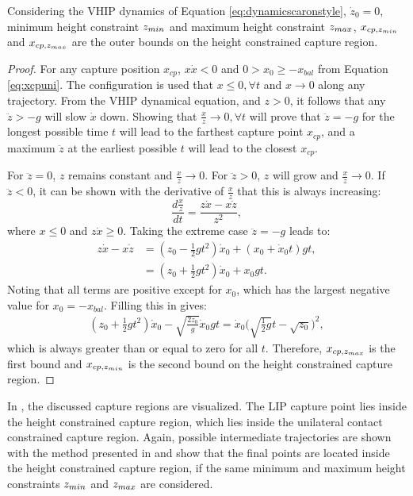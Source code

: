 \begin{lem}\label{lem:regionz}
Considering the \ac{VHIP} dynamics of Equation \eqref{eq:dynamicscaronstyle}, $\dot{z}_0=0$, minimum height constraint $z_{min}$ and maximum height constraint $z_{max}$, $x_{cp,z_{min}}$ and $x_{cp,z_{max}}$ are the outer bounds on the height constrained capture region.
\end{lem}
\begin{proof}
For any capture position $x_{cp}$, $x\dot{x}<0$ \cite{koolen2016balance} and $0>x_0\geq-x_{bal}$ from Equation \eqref{eq:xcpuni}. 
The configuration is used that $x \leq 0, \forall t$ and $x\rightarrow 0$ along any trajectory. From the \ac{VHIP} dynamical equation, and $z>0$, it follows that any $\ddot{z}>-g$ will slow $\dot{x}$ down. Showing that $\frac{x}{z}\rightarrow 0, \forall t$ will prove that $\ddot{z}=-g$ for the longest possible time $t$ will lead to the farthest capture point $x_{cp}$, and a maximum $\ddot{z}$ at the earliest possible $t$ will lead to the closest $x_{cp}$. 

For $\ddot{z}=0$, $z$ remains constant and $\frac{x}{z}\rightarrow 0$. For $\ddot{z}>0$, $z$ will grow and $\frac{x}{z}\rightarrow 0$. If $\ddot{z}<0$, it can be shown with the derivative of $\frac{x}{z}$ that this is always increasing:
\begin{equation}
\frac{d\frac{x}{z}}{dt}= \frac{z\dot{x}-x\dot{z}}{z^2},
\end{equation}
where $x \leq 0$ and $z \dot{x} \geq 0$. Taking the extreme case $\ddot{z}=-g$ leads to:
\begin{align}
	z\dot{x}-x\dot{z} &= (z_0 - \frac{1}{2}gt^2)\dot{x}_0 + (x_0 + \dot{x}_0 t)gt,\\
	&= (z_0 +\frac{1}{2}gt^2)\dot{x}_0 + x_0gt.
\end{align}
Noting that all terms are positive except for $x_0$, which has the largest negative value for $x_0=-x_{bal}$. Filling this in gives:
\begin{align}
	(z_0 +\frac{1}{2}gt^2)\dot{x}_0 - \sqrt{\frac{2z_0}{g}}\dot{x}_0gt = \dot{x}_0\bigg(\sqrt{\frac{1}{2}g}t - \sqrt{z_0}\bigg)^2,
\end{align}
which is always greater than or equal to zero for all $t$. Therefore, $x_{cp,z_{max}}$ is the first bound and $x_{cp,z_{min}}$ is the second bound on the height constrained capture region.
\end{proof}
In , the discussed capture regions are visualized. The LIP capture point lies inside the height constrained capture region, which lies inside the unilateral contact constrained capture region. Again, possible intermediate trajectories are shown with the method presented in \cite{koolen2016balance} and show that the final points are located inside the height constrained capture region, if the same minimum and maximum height constraints $z_{min}$ and $z_{max}$ are considered.

